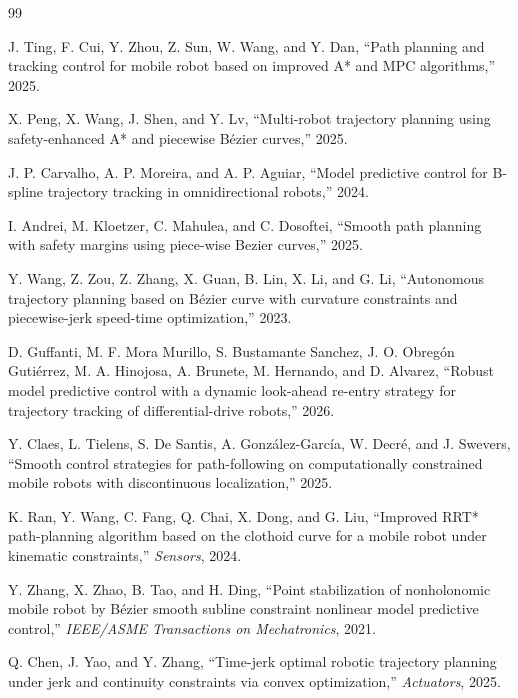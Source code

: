 \begin{thebibliography}{99}


J. Ting, F. Cui, Y. Zhou, Z. Sun, W. Wang, and Y. Dan, ``Path planning and tracking control for mobile robot based on improved A* and MPC algorithms,'' 2025.

X. Peng, X. Wang, J. Shen, and Y. Lv, ``Multi-robot trajectory planning using safety-enhanced A* and piecewise Bézier curves,'' 2025.

J. P. Carvalho, A. P. Moreira, and A. P. Aguiar, ``Model predictive control for B-spline trajectory tracking in omnidirectional robots,'' 2024.

I. Andrei, M. Kloetzer, C. Mahulea, and C. Dosoftei, ``Smooth path planning with safety margins using piece-wise Bezier curves,'' 2025.

Y. Wang, Z. Zou, Z. Zhang, X. Guan, B. Lin, X. Li, and G. Li, ``Autonomous trajectory planning based on Bézier curve with curvature constraints and piecewise-jerk speed-time optimization,'' 2023.

D. Guffanti, M. F. Mora Murillo, S. Bustamante Sanchez, J. O. Obregón Gutiérrez, M. A. Hinojosa, A. Brunete, M. Hernando, and D. Alvarez, ``Robust model predictive control with a dynamic look-ahead re-entry strategy for trajectory tracking of differential-drive robots,'' 2026.

Y. Claes, L. Tielens, S. De Santis, A. González-García, W. Decré, and J. Swevers, ``Smooth control strategies for path-following on computationally constrained mobile robots with discontinuous localization,'' 2025.

K. Ran, Y. Wang, C. Fang, Q. Chai, X. Dong, and G. Liu, ``Improved RRT* path-planning algorithm based on the clothoid curve for a mobile robot under kinematic constraints,'' \emph{Sensors}, 2024.

Y. Zhang, X. Zhao, B. Tao, and H. Ding, ``Point stabilization of nonholonomic mobile robot by Bézier smooth subline constraint nonlinear model predictive control,'' \emph{IEEE/ASME Transactions on Mechatronics}, 2021.

Q. Chen, J. Yao, and Y. Zhang, ``Time-jerk optimal robotic trajectory planning under jerk and continuity constraints via convex optimization,'' \emph{Actuators}, 2025.


\end{thebibliography}
